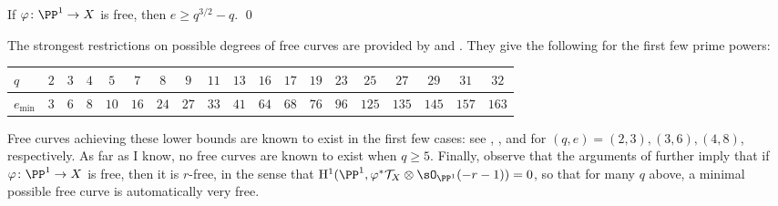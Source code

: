 \begin{Theorem}\label{superlinear-bound}
If \(\varphi \colon \PP^1 \to X\) is free, then \(e \geq q^{3/2} - q\).
\qed
\end{Theorem}

The strongest restrictions on possible degrees of free curves are provided by
 and . They give the following for the first
few prime powers:
\begin{center}
\begin{tabular}{l|c|c|c|c|c|c|c|c|c|c|c|c|c|c|c|c|c|c}
\(q\) & \(2\) & \(3\) & \(4\) & \(5\)  & \(7\)  & \(8\)  & \(9\)  & \(11\) & \(13\) & \(16\) & \(17\) & \(19\) & \(23\) & \(25\) & \(27\) & \(29\) & \(31\) & \(32\) \\
\hline
\(e_{\mathrm{min}}\) & \(3\) & \(6\) & \(8\) & \(10\) & \(16\) & \(24\) & \(27\) & \(33\) & \(41\) & \(64\) & \(68\) & \(76\) & \(96\) & \(125\) & \(135\) & \(145\) & \(157\) & \(163\)
\end{tabular}
\end{center}
Free curves achieving these lower bounds are known to exist in the first few
cases: see \cite[p.6]{Madore}, \cite[p.69]{Conduche}, and \cite{BDENY} for
\((q,e) = (2,3), (3,6), (4,8)\), respectively. As far as I know, no free
curves are known to exist when \(q \geq 5\). Finally, observe that the
arguments of  further imply that if \(\varphi \colon \PP^1
\to X\) is free, then it is \(r\)-free, in the sense that
\(\mathrm{H}^1(\PP^1, \varphi^*\mathcal{T}_X \otimes \sO_{\PP^1}(-r-1)) =
0\), so that for many \(q\) above, a minimal possible free curve is
automatically very free.




